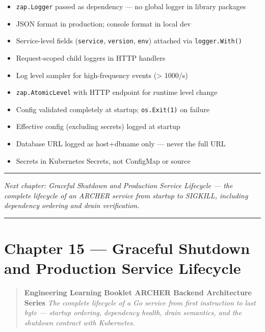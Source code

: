 \documentclass[
]{article}
\providecommand{\tightlist}{%
  \setlength{\itemsep}{0pt}\setlength{\parskip}{0pt}}
\begin{document}
\begin{itemize}
\tightlist
\item[$\square$]
  \texttt{zap.Logger} passed as dependency --- no global logger in
  library packages
\item[$\square$]
  JSON format in production; console format in local dev
\item[$\square$]
  Service-level fields (\texttt{service}, \texttt{version},
  \texttt{env}) attached via \texttt{logger.With()}
\item[$\square$]
  Request-scoped child loggers in HTTP handlers
\item[$\square$]
  Log level sampler for high-frequency events (\textgreater{} 1000/s)
\item[$\square$]
  \texttt{zap.AtomicLevel} with HTTP endpoint for runtime level change
\item[$\square$]
  Config validated completely at startup; \texttt{os.Exit(1)} on failure
\item[$\square$]
  Effective config (excluding secrets) logged at startup
\item[$\square$]
  Database URL logged as host+dbname only --- never the full URL
\item[$\square$]
  Secrets in Kubernetes Secrets, not ConfigMap or source
\end{itemize}

\begin{center}\rule{0.5\linewidth}{0.5pt}\end{center}

\emph{Next chapter: Graceful Shutdown and Production Service Lifecycle
--- the complete lifecycle of an ARCHER service from startup to SIGKILL,
including dependency ordering and drain verification.}

\begin{center}\rule{0.5\linewidth}{0.5pt}\end{center}

\hypertarget{chapter-15-graceful-shutdown-and-production-service-lifecycle}{%
\section{Chapter 15 --- Graceful Shutdown and Production Service
Lifecycle}\label{chapter-15-graceful-shutdown-and-production-service-lifecycle}}

\begin{quote}
\textbf{Engineering Learning Booklet \textbar{} ARCHER Backend
Architecture Series} \emph{The complete lifecycle of a Go service from
first instruction to last byte --- startup ordering, dependency health,
drain semantics, and the shutdown contract with Kubernetes.}
\end{quote}
\end{document}
